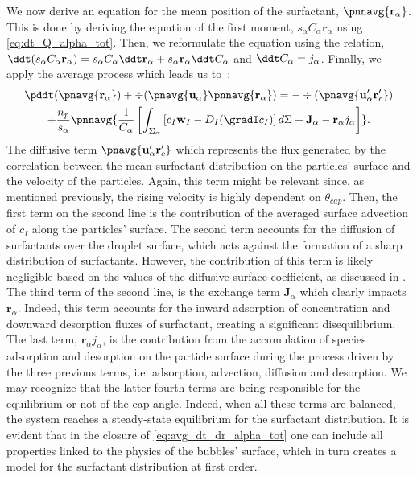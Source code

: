 We now derive an equation for the mean position of the surfactant, $\pnnavg{\textbf{r}_\alpha}$.
This is done by deriving the equation of the first moment, $s_\alpha C_\alpha \textbf{r}_\alpha$ using \ref{eq:dt_Q_alpha_tot}. 
Then, we reformulate the equation using  the relation, $\ddt (s_\alpha C_\alpha \textbf{r}_\alpha) = s_\alpha C_\alpha\ddt \textbf{r}_\alpha+ s_\alpha \textbf{r}_\alpha\ddt C_\alpha $ and  $\ddt C_\alpha = j_\alpha$. 
Finally,  we apply the average process which leads us to~:
\begin{multline}
    \pddt (\pnavg{\textbf{r}_\alpha})
    + \div (\pnavg{\textbf{u}_\alpha}\pnnavg{\textbf{r}_\alpha})
    =
    - \div (\pnavg{\textbf{u}'_\alpha\textbf{r}'_c})\\
    + \frac{n_p}{s_\alpha}\pnnavg{
        \frac{1}{C_\alpha}\left[
            \int_{\Sigma_\alpha} 
            \left[
                c_I \textbf{w}_I
                - D_I (\gradI c_I)
            \right] d\Sigma
            +\textbf{J}_\alpha
            - \textbf{r}_\alpha j_\alpha
        \right]
    }.
    \label{eq:avg_dt_dr_alpha_tot}
\end{multline}
The diffusive term $\pnavg{\textbf{u}'_\alpha\textbf{r}'_c}$ which represents the flux generated by the correlation between the mean surfactant distribution on the particles' surface and the velocity of the particles. 
Again, this term might be relevant since, as mentioned previously, the rising velocity is highly dependent on $\theta_{cap}$.
Then, the first term on the second line is the contribution of the averaged surface advection of $c_I$ along the particles' surface. 
The second term accounts for the diffusion of surfactants over the droplet surface, which acts against the formation of a sharp distribution of surfactants.
However, the contribution of this term is likely negligible based on the values of the diffusive surface coefficient, as discussed in \citet{valkovska2000determination}.
The third term of the second line, is the exchange term $\textbf{J}_\alpha$ which clearly impacts $\textbf{r}_\alpha$.
Indeed, this term accounts for the inward adsorption of concentration and downward desorption fluxes of surfactant, creating a significant disequilibrium. 
The last term, $\textbf{r}_\alpha j_\alpha$, is the contribution from the accumulation of species adsorption and desorption on the particle surface during the process driven by the three previous terms, i.e. adsorption, advection, diffusion and desorption. 
We may recognize that the latter fourth terms are being responsible for the equilibrium or not of the cap angle. 
Indeed, when all these terms are balanced, the system reaches a steady-state equilibrium for the surfactant distribution.
It is evident that in the closure of \ref{eq:avg_dt_dr_alpha_tot} one can include all properties linked to the physics of the bubbles' surface, which in turn creates a model for the surfactant distribution at first order. 

